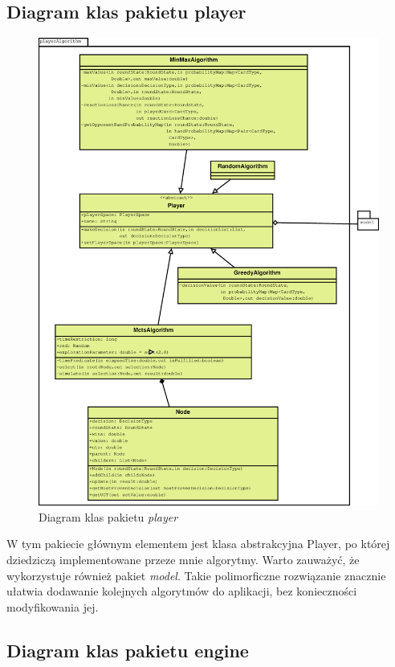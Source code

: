 \subsection{Diagram klas pakietu player}

\begin{figure}[H]
	\centering
	\includegraphics[width=\textwidth]{Resources/diagramKlas_player.eps}
	\caption{Diagram klas pakietu \textit{player}} 
	\label{fig:llMainImage}
\end{figure}

W tym pakiecie głównym elementem jest klasa abstrakcyjna Player, po której dziedziczą implementowane przeze mnie algorytmy. Warto zauważyć, że wykorzystuje również pakiet \textit{model}. Takie polimorficzne rozwiązanie znacznie ułatwia dodawanie kolejnych algorytmów do aplikacji, bez konieczności modyfikowania jej.

\subsection{Diagram klas pakietu engine}

